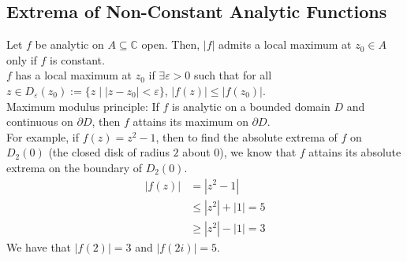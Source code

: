 \documentclass[10pt]{extarticle}
\newcommand{\C}{\mathbb{C}}
\begin{document}
  \subsection{Extrema of Non-Constant Analytic Functions}%
  Let $f$ be analytic on $A\subseteq \C$ open. Then, $|f|$ admits a local maximum at $z_0\in A$ only if $f$ is constant.\\

  $f$ has a local maximum at $z_0$ if $\exists \varepsilon > 0$ such that for all $z\in D_\varepsilon(z_0) := \{z\mid |z-z_0| < \varepsilon\}$, $|f(z)| \leq |f(z_0)|$.\\

  Maximum modulus principle: If $f$ is analytic on a bounded domain $D$ and continuous on $\partial D$, then $f$ attains its maximum on $\partial D$.\\

  For example, if $f(z) = z^2 - 1$, then to find the absolute extrema of $f$ on $D_2(0)$ (the closed disk of radius $2$ about $0$), we know that $f$ attains its absolute extrema on the boundary of $D_2(0)$.
  \begin{align*}
    |f(z)| &= |z^2 - 1|\\
           &\leq |z^2| + |1| = 5\\
           &\geq |z^2| - |1| = 3
  \end{align*}
  We have that $|f(2)| = 3$ and $|f(2i)| = 5$.\\
\end{document}
